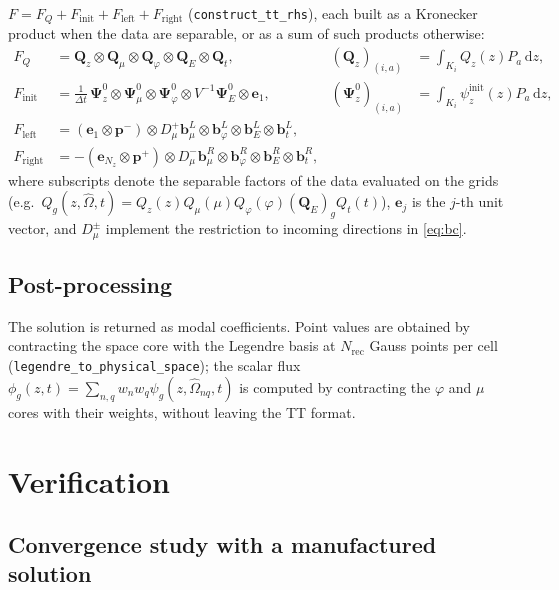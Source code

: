 \documentclass[11pt,a4paper]{article}
\numberwithin{equation}{section}
\theoremstyle{remark}
\newcommand{\Om}{\hat{\Omega}}
\newcommand{\dd}{\mathrm{d}}
\newcommand{\kron}{\otimes}
\newcommand{\pp}{{\bm{p}^{+}}}
\newcommand{\pmn}{{\bm{p}^{-}}}
\begin{document}
$F=F_Q+F_{\mathrm{init}}+F_{\mathrm{left}}+F_{\mathrm{right}}$ (\texttt{construct\_tt\_rhs}), each built as a Kronecker product when the data are separable, or as a sum of such products otherwise:
\begin{align}
F_Q&=\bm Q_z\kron\bm Q_\mu\kron\bm Q_\varphi\kron\bm Q_E\kron\bm Q_t, & (\bm Q_z)_{(i,a)}&=\int_{K_i}Q_z(z)P_a\,\dd z,\\
F_{\mathrm{init}}&=\tfrac{1}{\Delta t}\,\bm\Psi^0_z\kron\bm\Psi^0_\mu\kron\bm\Psi^0_\varphi\kron V^{-1}\bm\Psi^0_E\kron\bm e_1, & (\bm\Psi^0_z)_{(i,a)}&=\int_{K_i}\psi^{\mathrm{init}}_z(z)P_a\,\dd z,\\
F_{\mathrm{left}}&=(\bm e_1\kron\pmn)\kron D_\mu^{+}\bm b^{L}_\mu\kron\bm b^L_\varphi\kron\bm b^L_E\kron\bm b^L_t, \\
F_{\mathrm{right}}&=-(\bm e_{N_z}\kron\pp)\kron D_\mu^{-}\bm b^{R}_\mu\kron\bm b^R_\varphi\kron\bm b^R_E\kron\bm b^R_t,
\end{align}
where subscripts denote the separable factors of the data evaluated on the grids (e.g.\ $Q_g(z,\Om,t)=Q_z(z)Q_\mu(\mu)Q_\varphi(\varphi)(\bm Q_E)_gQ_t(t)$), $\bm e_j$ is the $j$-th unit vector, and $D_\mu^\pm$ implement the restriction to incoming directions in \eqref{eq:bc}.

\subsection{Post-processing}

The solution is returned as modal coefficients. Point values are obtained by contracting the space core with the Legendre basis at $N_{\mathrm{rec}}$ Gauss points per cell (\texttt{legendre\_to\_physical\_space}); the scalar flux $\phi_g(z,t)=\sum_{n,q}w_nw_q\psi_g(z,\Om_{nq},t)$ is computed by contracting the $\varphi$ and $\mu$ cores with their weights, without leaving the TT format.

\section{Verification}
\label{sec:verification}

\subsection{Convergence study with a manufactured solution}
\label{sec:mms}
\end{document}
